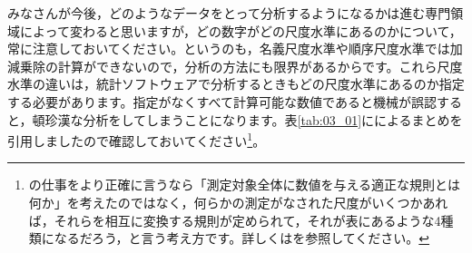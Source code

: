 \documentclass{ltjsbook}
\begin{document}
みなさんが今後，どのようなデータをとって分析するようになるかは進む専門領域によって変わると思いますが，どの数字がどの尺度水準にあるのかについて，常に注意しておいてください。というのも，名義尺度水準や順序尺度水準では加減乗除の計算ができないので，分析の方法にも限界があるからです。これら尺度水準の違いは，統計ソフトウェアで分析するときもどの尺度水準にあるのか指定する必要があります。指定がなくすべて計算可能な数値であると機械が誤認すると，頓珍漢な分析をしてしまうことになります。表\ref{tab:03_01}に\textcite{stevens1946}によるまとめを引用しましたので確認しておいてください\footnote{\textcite{stevens1946}の仕事をより正確に言うなら「測定対象全体に数値を与える適正な規則とは何か」を考えたのではなく，何らかの測定がなされた尺度がいくつかあれば，それらを相互に変換する規則が定められて，それが表にあるような4種類になるだろう，と言う考え方です。詳しくは\textcite{Yoshino2007}を参照してください。}。
\end{document}
